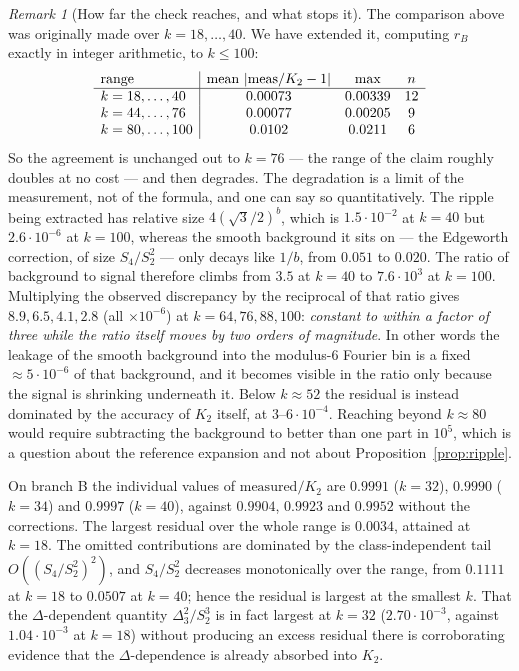 \documentclass[11pt,a4paper]{article}
\theoremstyle{plain}
\theoremstyle{definition}
\theoremstyle{remark}
\newtheorem{remark}[theorem]{Remark}
\begin{document}
\begin{remark}[How far the check reaches, and what stops it]\label{rem:ripplerange}
The comparison above was originally made over $k=18,\dots,40$. We have extended
it, computing $r_B$ exactly in integer arithmetic, to $k\le100$:
\[
  \begin{array}{l|ccc}
    \text{range} & \text{mean }|{\rm meas}/K_2-1| & \text{max} & n\\\hline
    k=18,\dots,40 & 0.00073 & 0.00339 & 12\\
    k=44,\dots,76 & 0.00077 & 0.00205 & 9\\
    k=80,\dots,100 & 0.0102 & 0.0211 & 6
  \end{array}
\]
So the agreement is unchanged out to $k=76$ --- the range of the claim roughly
doubles at no cost --- and then degrades. The degradation is a limit of the
measurement, not of the formula, and one can say so quantitatively. The ripple
being extracted has relative size $4(\sqrt3/2)^{b}$, which is
$1.5\cdot10^{-2}$ at $k=40$ but $2.6\cdot10^{-6}$ at $k=100$, whereas the smooth
background it sits on --- the Edgeworth correction, of size $S_4/S_2^{2}$ ---
only decays like $1/b$, from $0.051$ to $0.020$. The ratio of background to
signal therefore climbs from $3.5$ at $k=40$ to $7.6\cdot10^{3}$ at $k=100$.
Multiplying the observed discrepancy by the reciprocal of that ratio gives
$8.9,6.5,4.1,2.8$ (all $\times10^{-6}$) at $k=64,76,88,100$: \emph{constant to
within a factor of three while the ratio itself moves by two orders of
magnitude}. In other words the leakage of the smooth background into the
modulus-$6$ Fourier bin is a fixed $\approx5\cdot10^{-6}$ of that background,
and it becomes visible in the ratio only because the signal is shrinking
underneath it. Below $k\approx52$ the residual is instead dominated by the
accuracy of $K_2$ itself, at $3$--$6\cdot10^{-4}$. Reaching beyond $k\approx80$
would require subtracting the background to better than one part in $10^{5}$,
which is a question about the reference expansion and not about
Proposition~\ref{prop:ripple}.
\end{remark}

On branch B the individual values of $\text{measured}/K_2$ are $0.9991$
($k=32$), $0.9990$ ($k=34$) and $0.9997$ ($k=40$), against $0.9904$, $0.9923$
and $0.9952$ without the corrections. The largest residual over the whole range
is $0.0034$, attained at $k=18$. The omitted contributions are dominated by the
class-independent tail $O((S_4/S_2^{2})^{2})$, and $S_4/S_2^{2}$ decreases
monotonically over the range, from $0.1111$ at $k=18$ to $0.0507$ at $k=40$;
hence the residual is largest at the smallest $k$. That the $\Delta$-dependent
quantity $\Delta_3^{2}/S_2^{3}$ is in fact largest at $k=32$
($2.70\cdot10^{-3}$, against $1.04\cdot10^{-3}$ at $k=18$) without producing an
excess residual there is corroborating evidence that the $\Delta$-dependence is
already absorbed into $K_2$.
\end{document}
